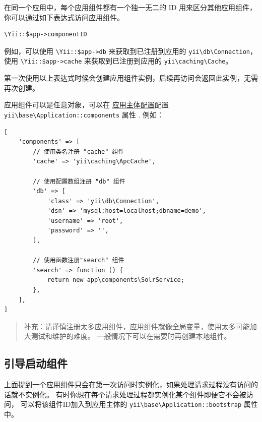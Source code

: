 在同一个应用中，每个应用组件都有一个独一无二的 ID 用来区分其他应用组件，你可以通过如下表达式访问应用组件。

\lstset{language=php}\begin{lstlisting}
\Yii::$app->componentID
\end{lstlisting}
例如，可以使用 \lstinline|\Yii::$app->db| 来获取到已注册到应用的 \texttt{yii{\allowbreak{}\textbackslash}db{\allowbreak{}\textbackslash}Connection}，
使用 \lstinline|\Yii::$app->cache| 来获取到已注册到应用的 \texttt{yii{\allowbreak{}\textbackslash}caching{\allowbreak{}\textbackslash}Cache}。

第一次使用以上表达式时候会创建应用组件实例，后续再访问会返回此实例，无需再次创建。

应用组件可以是任意对象，可以在 \hyperref[structure-applications.md::application-configurations]{应用主体配置}配置 \texttt{yii{\allowbreak{}\textbackslash}base{\allowbreak{}\textbackslash}Application\allowbreak{}::\allowbreak{}components} 属性 .
例如：

\lstset{language=php}\begin{lstlisting}
[
    'components' => [
        // 使用类名注册 "cache" 组件
        'cache' => 'yii\caching\ApcCache',

        // 使用配置数组注册 "db" 组件
        'db' => [
            'class' => 'yii\db\Connection',
            'dsn' => 'mysql:host=localhost;dbname=demo',
            'username' => 'root',
            'password' => '',
        ],

        // 使用函数注册"search" 组件
        'search' => function () {
            return new app\components\SolrService;
        },
    ],
]
\end{lstlisting}
\begin{quote}补充：请谨慎注册太多应用组件，应用组件就像全局变量，使用太多可能加大测试和维护的难度。
  一般情况下可以在需要时再创建本地组件。

\end{quote}
\subsection{引导启动组件 \label{structure-application-components.md::bootstrapping-components}}
上面提到一个应用组件只会在第一次访问时实例化，如果处理请求过程没有访问的话就不实例化。
有时你想在每个请求处理过程都实例化某个组件即便它不会被访问，
可以将该组件ID加入到应用主体的 \texttt{yii{\allowbreak{}\textbackslash}base{\allowbreak{}\textbackslash}Application\allowbreak{}::\allowbreak{}bootstrap} 属性中。

